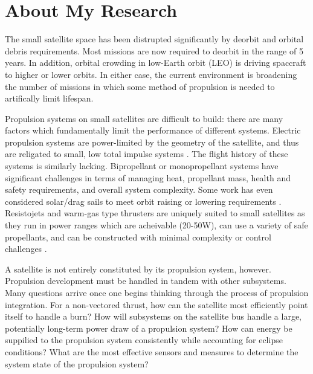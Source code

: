 
\section{About My Research}

The small satellite space has been distrupted significantly by deorbit and orbital debris requirements. Most missions are now required to deorbit in the range of 5 years. In addition, orbital crowding in low-Earth orbit (LEO) is driving spaccraft to higher or lower orbits. In either case, the current environment is broadening the number of missions in which some method of propulsion is needed to artifically limit lifespan.

Propulsion systems on small satellites are difficult to build: there are many factors which fundamentally limit the performance of different systems. Electric propulsion systems are power-limited by the geometry of the satellite\cite{clarkHugePowerDemandItsyBitsy2010}, and thus are religated to small, low total impulse systems \cite{krejciStagingElectricPropulsion2019}. The flight history of these systems is similarly lacking. Bipropellant or monopropellant systems have significant challenges in terms of managing heat, propellant mass, health and safety requirements, and overall system complexity\cite{hugginsDevelopmentCubeSatScaleGreen2021}. Some work has even considered solar/drag sails to meet orbit raising or lowering requirements \cite{lappasCubeSailLowCost2011}. Resistojets and warm-gas type thrusters are uniquely suited to small satellites as they run in power ranges which are acheivable (20-50W), can use a variety of safe propellants, and can be constructed with minimal complexity or control challenges \cite{tummalaOverviewCubeSatellitePropulsion2017}.

A satellite is not entirely constituted by its propulsion system, however. Propulsion development must be handled in tandem with other subsystems. Many questions arrive once one begins thinking through the process of propulsion integration. For a non-vectored thrust, how can the satellite most efficiently point itself to handle a burn? How will subsystems on the satellite bus handle a large, potentially long-term power draw of a propulsion system? How can energy be suppilied to the propulsion system consistently while accounting for eclipse conditions? What are the most effective sensors and measures to determine the system state of the propulsion system?

